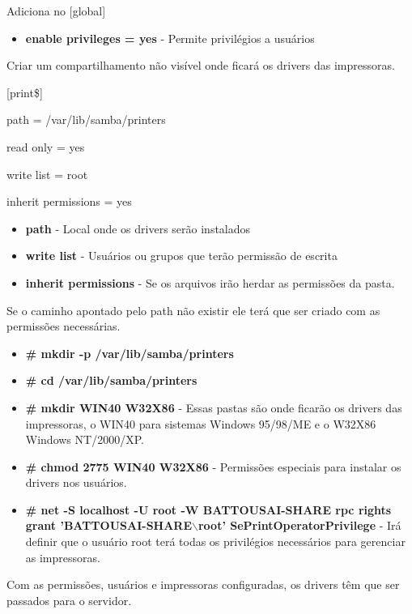 Adiciona no [global]

\begin{itemize}
	\item \textbf{enable privileges = yes} - Permite privilégios a usuários
\end{itemize}

Criar um compartilhamento não visível onde ficará os drivers das impressoras.

[print\$]

path = /var/lib/samba/printers

read only = yes

write list = root

inherit permissions = yes

\begin{itemize}
	\item \textbf{path} - Local onde os drivers serão instalados
	\item \textbf{write list} - Usuários ou grupos que terão permissão de escrita
	\item \textbf{inherit permissions} - Se os arquivos irão herdar as permissões da pasta.
\end{itemize}

Se o caminho apontado pelo path não existir ele terá que ser criado com as permissões necessárias.

\begin{itemize}
	\item \textbf{\# mkdir -p /var/lib/samba/printers}
	
	\item \textbf{\# cd /var/lib/samba/printers}
	\item \textbf{\# mkdir WIN40 W32X86} - Essas pastas são onde ficarão os drivers das impressoras, o WIN40 para sistemas Windows 95/98/ME e o W32X86 Windows NT/2000/XP.
	\item \textbf{\# chmod 2775 WIN40 W32X86} - Permissões especiais para instalar os drivers nos usuários.
	\item \textbf{\# net -S localhost -U root -W BATTOUSAI-SHARE rpc rights grant 'BATTOUSAI-SHARE$\backslash$root' SePrintOperatorPrivilege} - Irá definir que o usuário root terá todas os privilégios necessários para gerenciar as impressoras.
\end{itemize}

Com as permissões, usuários e impressoras configuradas, os drivers têm que ser passados para o servidor.


